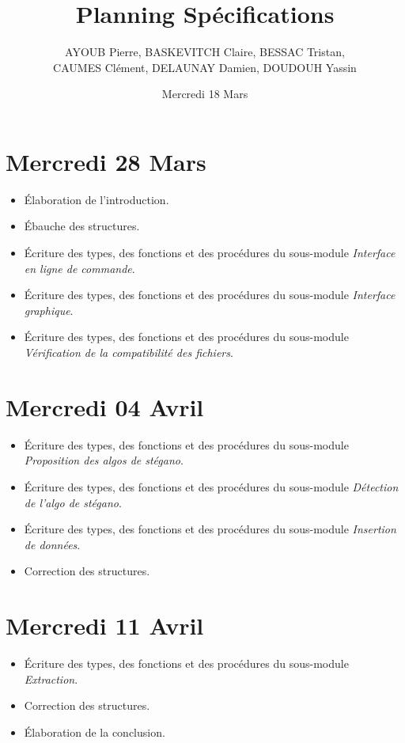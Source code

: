 \documentclass[11pt]{article}
\title{Planning Spécifications}
\author{AYOUB Pierre, BASKEVITCH Claire, BESSAC Tristan, \\
CAUMES Clément, DELAUNAY Damien, DOUDOUH Yassin}
\date{Mercredi 18 Mars}
\begin{document}
\maketitle

\section{Mercredi 28 Mars}
\begin {itemize}
\item Élaboration de l'introduction. 
\item Ébauche des structures.
\item Écriture des types, des fonctions et des procédures du sous-module 
\textit{Interface en ligne de commande}.
\item Écriture des types, des fonctions et des procédures du sous-module 
\textit{Interface graphique}. 
\item Écriture des types, des fonctions et des procédures du sous-module 
\textit{Vérification de la compatibilité des fichiers}.
\end{itemize}

\section{Mercredi 04 Avril}
\begin {itemize}
\item Écriture des types, des fonctions et des procédures du sous-module 
\textit{Proposition des algos de stégano}.
\item Écriture des types, des fonctions et des procédures du sous-module 
\textit{Détection de l'algo de stégano}. 
\item Écriture des types, des fonctions et des procédures du sous-module 
\textit{Insertion de données}.
\item Correction des structures. 
\end{itemize}

\section{Mercredi 11 Avril}
\begin {itemize}
\item Écriture des types, des fonctions et des procédures du sous-module 
\textit{Extraction}.
\item Correction des structures. 
\item Élaboration de la conclusion.
\end{itemize}
\end{document}
